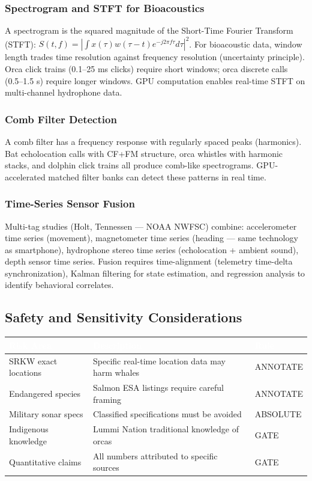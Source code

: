 \documentclass[11pt,letterpaper]{article}
\newcommand{\tableheader}[1]{\textbf{\sffamily\textcolor{white}{#1}}}
\begin{document}
\subsubsection{Spectrogram and STFT for Bioacoustics}
A spectrogram is the squared magnitude of the Short-Time Fourier Transform (STFT): $S(t,f) = \left| \int x(\tau) w(\tau-t) e^{-j2\pi f\tau} d\tau \right|^2$. For bioacoustic data, window length trades time resolution against frequency resolution (uncertainty principle). Orca click trains (0.1--25 ms clicks) require short windows; orca discrete calls (0.5--1.5 s) require longer windows. GPU computation enables real-time STFT on multi-channel hydrophone data.

\subsubsection{Comb Filter Detection}
A comb filter has a frequency response with regularly spaced peaks (harmonics). Bat echolocation calls with CF+FM structure, orca whistles with harmonic stacks, and dolphin click trains all produce comb-like spectrograms. GPU-accelerated matched filter banks can detect these patterns in real time.

\subsubsection{Time-Series Sensor Fusion}
Multi-tag studies (Holt, Tennessen --- NOAA NWFSC) combine: accelerometer time series (movement), magnetometer time series (heading --- same technology as smartphone), hydrophone stereo time series (echolocation + ambient sound), depth sensor time series. Fusion requires time-alignment (telemetry time-delta synchronization), Kalman filtering for state estimation, and regression analysis to identify behavioral correlates.

\subsection{Safety and Sensitivity Considerations}

\begin{center}
\begin{tabularx}{\textwidth}{L{3.5cm}XL{2cm}}
\toprule
{}
\tableheader{Risk Area} & \tableheader{Description} & \tableheader{Rule} \\
\midrule
SRKW exact locations & Specific real-time location data may harm whales & ANNOTATE \\
Endangered species & Salmon ESA listings require careful framing & ANNOTATE \\
Military sonar specs & Classified specifications must be avoided & ABSOLUTE \\
Indigenous knowledge & Lummi Nation traditional knowledge of orcas & GATE \\
Quantitative claims & All numbers attributed to specific sources & GATE \\
\bottomrule
\end{tabularx}
\end{center}
\end{document}
